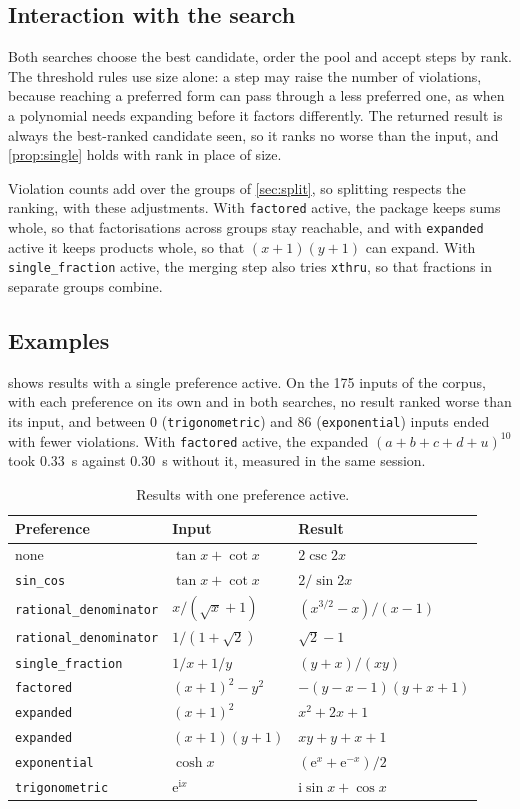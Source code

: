 \documentclass[11pt]{amsart}
\newcommand{\mx}{\lstinline[style=mx]}
\theoremstyle{definition}
\theoremstyle{remark}
\begin{document}
\subsection{Interaction with the search}

Both searches choose the best candidate, order the pool and accept steps by
rank. The threshold rules use size alone: a step may raise the number of
violations, because reaching a preferred form can pass through a less
preferred one, as when a polynomial needs expanding before it factors
differently. The returned result is always the best-ranked candidate seen,
so it ranks no worse than the input, and \cref{prop:single} holds with rank
in place of size.

Violation counts add over the groups of \cref{sec:split}, so splitting
respects the ranking, with these adjustments. With \mx|factored| active, the
package keeps sums whole, so that factorisations across groups stay
reachable, and with \mx|expanded| active it keeps products whole, so that
$(x+1)(y+1)$ can expand. With \mx|single_fraction| active, the merging step
also tries \mx|xthru|, so that fractions in separate groups combine.

\subsection{Examples}

 shows results with a single preference active.
On the 175 inputs of the corpus, with each preference on its own and in both
searches, no result ranked worse than its input, and between 0
(\mx|trigonometric|) and 86 (\mx|exponential|) inputs ended with fewer
violations. With \mx|factored| active, the expanded $(a+b+c+d+u)^{10}$ took
0.33~s against 0.30~s without it, measured in the same session.

\begin{table}[ht]
\caption{Results with one preference active.}
\label{tab:prefer-examples}
\small
\begin{tabular}{@{}lll@{}}
\toprule
Preference & Input & Result \\
\midrule
none & $\tan x + \cot x$ & $2\csc 2x$ \\
\mx|sin_cos| & $\tan x + \cot x$ & $2/\sin 2x$ \\
\mx|rational_denominator| & $x/(\sqrt{x}+1)$ & $(x^{3/2} - x)/(x - 1)$ \\
\mx|rational_denominator| & $1/(1+\sqrt2)$ & $\sqrt2 - 1$ \\
\mx|single_fraction| & $1/x + 1/y$ & $(y + x)/(xy)$ \\
\mx|factored| & $(x+1)^2 - y^2$ & $-(y - x - 1)(y + x + 1)$ \\
\mx|expanded| & $(x+1)^2$ & $x^2 + 2x + 1$ \\
\mx|expanded| & $(x+1)(y+1)$ & $xy + y + x + 1$ \\
\mx|exponential| & $\cosh x$ & $(\mathrm{e}^x + \mathrm{e}^{-x})/2$ \\
\mx|trigonometric| & $\mathrm{e}^{\mathrm{i}x}$ & $\mathrm{i}\sin x + \cos x$ \\
\bottomrule
\end{tabular}
\end{table}
\end{document}
